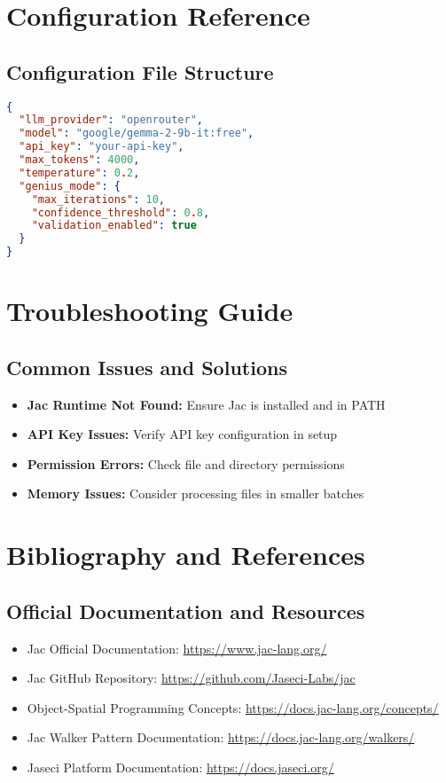 \documentclass[12pt,a4paper]{article}
\begin{document}
\section{Configuration Reference}

\subsection{Configuration File Structure}
\begin{lstlisting}[language=json]
{
  "llm_provider": "openrouter",
  "model": "google/gemma-2-9b-it:free",
  "api_key": "your-api-key",
  "max_tokens": 4000,
  "temperature": 0.2,
  "genius_mode": {
    "max_iterations": 10,
    "confidence_threshold": 0.8,
    "validation_enabled": true
  }
}
\end{lstlisting}

\section{Troubleshooting Guide}

\subsection{Common Issues and Solutions}
\begin{itemize}
    \item \textbf{Jac Runtime Not Found:} Ensure Jac is installed and in PATH
    \item \textbf{API Key Issues:} Verify API key configuration in setup
    \item \textbf{Permission Errors:} Check file and directory permissions
    \item \textbf{Memory Issues:} Consider processing files in smaller batches
\end{itemize}

\section{Bibliography and References}

\subsection{Official Documentation and Resources}
\begin{itemize}
    \item Jac Official Documentation: \url{https://www.jac-lang.org/}
    \item Jac GitHub Repository: \url{https://github.com/Jaseci-Labs/jac}
    \item Object-Spatial Programming Concepts: \url{https://docs.jac-lang.org/concepts/}
    \item Jac Walker Pattern Documentation: \url{https://docs.jac-lang.org/walkers/}
    \item Jaseci Platform Documentation: \url{https://docs.jaseci.org/}
\end{itemize}
\end{document}
